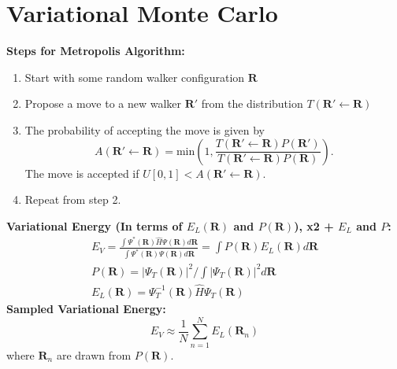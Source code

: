 \documentclass[12pt]{extarticle}
\newcommand{\R}{\mathrm{\mathbf{R}}}
\begin{document}
\section*{Variational Monte Carlo}
\textbf{Steps for Metropolis Algorithm:}
\begin{enumerate}
   \item{Start with some random walker configuration $\R$}
   \item{Propose a move to a new walker $\R'$ from the distribution $T(\R'\leftarrow\R)$}
   \item{The probability of accepting the move is given by \[A(\R'\leftarrow\R) = \mathrm{min}\left(1,\frac{T(\R'\leftarrow\R)P(\R')}{T(\R'\leftarrow\R)P(\R)}\right).\] The move is accepted if $U[0,1]<A(\R'\leftarrow\R)$.}
   \item{Repeat from step 2.}
\end{enumerate}
\textbf{Variational Energy (In terms of $E_L(\R)$ and $P(\R)$), x2 + $E_L$ and $P$:}
\begin{align*}
   E_V = \frac{\int\Psi^*(\R)\hat{H}\Psi(\R)d\R}{\int\Psi^*(\R)\Psi(\R)d\R} = \int P(\R)E_L(\R)d\R \\ P(\R) = |\Psi_T(\R)|^2/\int |\Psi_T(\R)|^2d\R\ \\ E_L(\R) = \Psi_T^{-1}(\R)\hat{H}\Psi_T(\R)
\end{align*}
\textbf{Sampled Variational Energy:}
\begin{equation*}
   E_V \approx \frac{1}{N}\sum\limits_{n=1}^N E_L(\R_n)
\end{equation*}
where $\R_n$ are drawn from $P(\R)$.
\end{document}
